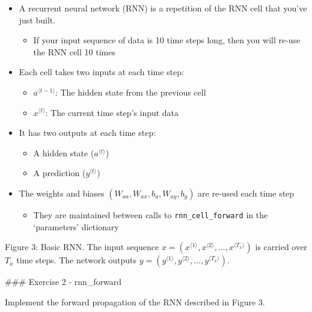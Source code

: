 \documentclass[11pt]{article}
\providecommand{\tightlist}{%
      \setlength{\itemsep}{0pt}\setlength{\parskip}{0pt}}
\begin{document}
\begin{itemize}
\tightlist
\item
  A recurrent neural network (RNN) is a repetition of the RNN cell that
  you've just built.

  \begin{itemize}
  \tightlist
  \item
    If your input sequence of data is 10 time steps long, then you will
    re-use the RNN cell 10 times
  \end{itemize}
\item
  Each cell takes two inputs at each time step:

  \begin{itemize}
  \tightlist
  \item
    \(a^{\langle t-1 \rangle}\): The hidden state from the previous cell
  \item
    \(x^{\langle t \rangle}\): The current time step's input data
  \end{itemize}
\item
  It has two outputs at each time step:

  \begin{itemize}
  \tightlist
  \item
    A hidden state (\(a^{\langle t \rangle}\))
  \item
    A prediction (\(y^{\langle t \rangle}\))
  \end{itemize}
\item
  The weights and biases \((W_{aa}, W_{ax}, b_{a}, W_{ay}, b_{y})\) are
  re-used each time step

  \begin{itemize}
  \tightlist
  \item
    They are maintained between calls to \texttt{rnn\_cell\_forward} in
    the `parameters' dictionary
  \end{itemize}
\end{itemize}

Figure 3: Basic RNN. The input sequence
\(x = (x^{\langle 1 \rangle}, x^{\langle 2 \rangle}, ..., x^{\langle T_x \rangle})\)
is carried over \(T_x\) time steps. The network outputs
\(y = (y^{\langle 1 \rangle}, y^{\langle 2 \rangle}, ..., y^{\langle T_x \rangle})\).

    \#\#\# Exercise 2 - rnn\_forward

Implement the forward propagation of the RNN described in Figure 3.
\end{document}
